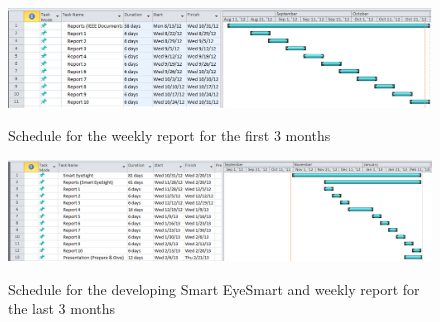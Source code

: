 \documentclass[12pt]{article}
\begin{document}
  \begin{figure}[H]\centering
  \includegraphics[width=6.5in]{images/schedule_reports}\\
  \caption{Schedule for the weekly report for the first 3 months}\label{reports}
  \end{figure}

  \begin{figure}[H]\centering
  \includegraphics[width=6.5in]{images/schedule_2nd}\\
  \caption{Schedule for the developing Smart EyeSmart and weekly report for the last 3 months}\label{2nd}
  \end{figure}
\end{document}
